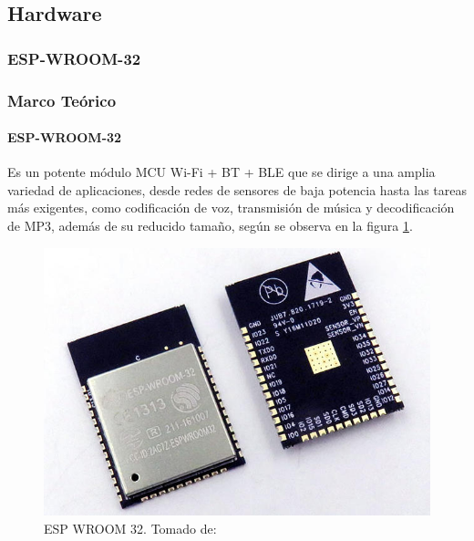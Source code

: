 \subsection{Hardware}

\subsubsection{ESP-WROOM-32}

\begin{frame}
\frametitle{Marco Teórico}
\framesubtitle{ESP-WROOM-32}

Es un potente módulo MCU Wi-Fi + BT + BLE que se dirige a una amplia variedad de aplicaciones, desde redes de sensores de baja potencia hasta las tareas más exigentes, como codificación de voz, transmisión de música y decodificación de MP3, además de su reducido tamaño, según se observa en la figura \ref{fig:esp32-wroom-s32-00}.\cite{EW32}

\begin{figure}[H]
	\centering
	\caption{ESP WROOM 32. Tomado de: \cite{ESPIMG}\label{fig:esp32-wroom-s32-00}}
	\includegraphics[width=0.4\linewidth]{Imagenes/esp32-wroom-s32-00}
\end{figure}
\end{frame}

